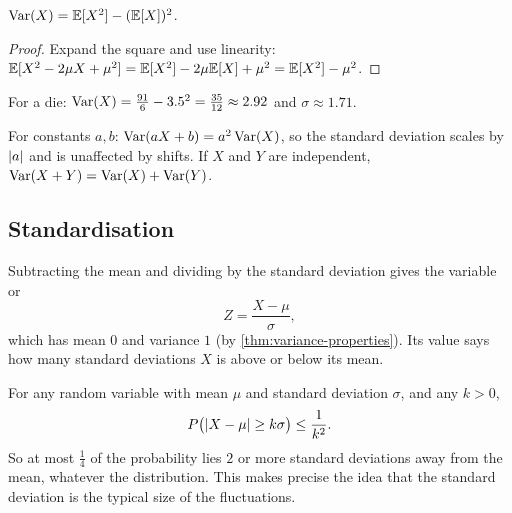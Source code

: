 \begin{proposition}\label{prop:variance-shortcut}
$\operatorname{Var}(X) = \mathbb{E}[X^2] - (\mathbb{E}[X])^2$.
\end{proposition}

\begin{proof}
Expand the square and use linearity: $\mathbb{E}[X^2 - 2\mu X + \mu^2] = \mathbb{E}[X^2] -
2\mu\mathbb{E}[X] + \mu^2 = \mathbb{E}[X^2] - \mu^2$.
\end{proof}

For a die: $\operatorname{Var}(X) = \frac{91}{6} - 3.5^2 = \frac{35}{12} \approx 2.92$ and
$\sigma \approx 1.71$.

\begin{theorem}\label{thm:variance-properties}
For constants $a, b$: $\operatorname{Var}(aX + b) = a^2\operatorname{Var}(X)$, so the standard deviation
scales by $\lvert a\rvert$ and is unaffected by shifts. If $X$ and $Y$ are independent,
$\operatorname{Var}(X + Y) = \operatorname{Var}(X) + \operatorname{Var}(Y)$.
\end{theorem}

\subsection{Standardisation}

Subtracting the mean and dividing by the standard deviation gives the
 variable or 
\[
  Z = \frac{X - \mu}{\sigma},
\]
which has mean $0$ and variance $1$ (by \cref{thm:variance-properties}). Its value
says how many standard deviations $X$ is above or below its mean.

\begin{remark}
For any random variable with mean $\mu$ and standard deviation $\sigma$, and any
$k > 0$,
\[
  P\bigl(\lvert X - \mu\rvert \ge k\sigma\bigr) \le \frac{1}{k^2}.
\]
So at most $\frac14$ of the probability lies $2$ or more standard deviations away
from the mean, whatever the distribution. This makes precise the idea that the
standard deviation is the typical size of the fluctuations.
\end{remark}

